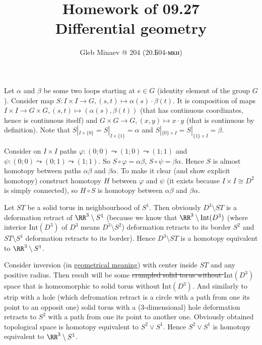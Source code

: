 \documentclass[12pt,a4paper]{article}
\title{Homework of 09.27\\Differential geometry}
\author{Gleb Minaev @ 204 (20.Б04-мкн)}
\date{}
\newcommand{\Int}{\mathrm{Int}}
\begin{document}
    \maketitle

    \begin{problem}{50}
        Let $\alpha$ and $\beta$ be some two loops starting at $e \in G$ (identity element of the group $G$). Consider map $S: I \times I \to G, (s, t) \mapsto \alpha(s) \cdot \beta(t)$. It is composition of maps $I \times I \to G \times G, (s, t) \mapsto (\alpha(s), \beta(t))$ (that has continuous coordinates, hence is continuous itself) and $G \times G \to G, (x, y) \mapsto x \cdot y$ (that is continuous by definition). Note that $S|_{I \times \{0\}} = S|_{I \times \{1\}} = \alpha$ and $S|_{\{0\} \times I} = S|_{\{1\} \times I} = \beta$.
        
        Consider on $I \times I$ paths $\varphi: (0; 0) \leadsto (1; 0) \leadsto (1; 1)$ and $\psi: (0; 0) \leadsto (0; 1) \leadsto (1; 1)$. So $S \circ \varphi = \alpha \beta$, $S \circ \psi = \beta \alpha$. Hence $S$ is almost homotopy between paths $\alpha \beta$ and $\beta \alpha$. To make it clear (and show explicit homotopy) construct homotopy $H$ between $\varphi$ and $\psi$ (it exists because $I \times I \cong D^2$ is simply connected), so $H \circ S$ is homotopy between $\alpha \beta$ and $\beta \alpha$.
    \end{problem}

    \begin{problem}{51}
        Let $ST$ be a solid torus in neighbourhood of $S^1$. Then obviously $D^3 \setminus ST$ is a deformation retract of $\RR^3 \setminus S^1$ (because we know that $\RR^3 \setminus \Int(D^3)$ (where interior $\Int(D^3)$ of $D^3$ means $D^3 \setminus S^2$) deformation retracts to its border $S^2$ and $ST \setminus S^1$ deformation retracts to its border). Hence $D^3 \setminus ST$ is a homotopy equivalent to $\RR^3 \setminus S^1$.

        Consider inversion (in \href{https://en.wikipedia.org/wiki/Inversive_geometry#In_three_dimensions}{geometrical meaning}) with center inside $ST$ and any positive radius. Then result will be some \sout{crumpled solid torus without $\Int(D^3)$} space that is homeomorphic to solid torus without $\Int(D^3)$. And similarly to strip with a hole (which defromation retract is a circle with a path from one its point to an opposit one) solid torus with a (3-dimensional) hole deformation retracts to $S^2$ with a path from one its point to another one. Obviously obtained topological space is homotopy equivalent to $S^2 \vee S^1$. Hence $S^2 \vee S^1$ is homotopy equivalent to $\RR^3 \setminus S^1$.
    \end{problem}
\end{document}
